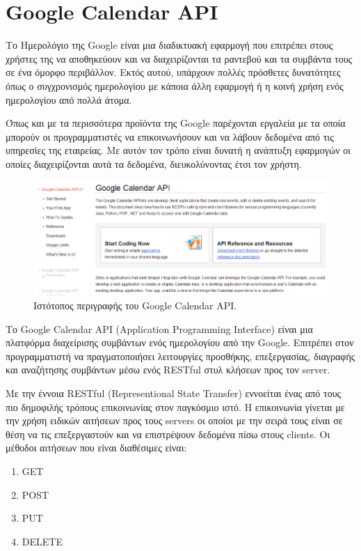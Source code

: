 
\chapter{Google Calendar API}
Το Ημερολόγιο της Google είναι μια διαδικτυακή εφαρμογή που επιτρέπει στους χρήστες της να αποθηκεύουν και να διαχειρίζονται τα ραντεβού και τα συμβάντα τους σε ένα όμορφο περιβάλλον. Εκτός αυτού, υπάρχουν πολλές πρόσθετες δυνατότητες όπως ο συγχρονισμός ημερολογίου με κάποια άλλη εφαρμογή ή η κοινή χρήση ενός ημερολογίου από 
πολλά άτομα.

Όπως και με τα περισσότερα προϊόντα της Google παρέχονται εργαλεία με τα οποία μπορούν οι προγραμματιστές να επικοινωνήσουν και να λάβουν δεδομένα από τις υπηρεσίες της εταιρείας. Με 
αυτόν τον τρόπο είναι δυνατή η ανάπτυξη εφαρμογών οι οποίες διαχειρίζονται αυτά τα δεδομένα, διευκολύνοντας έτσι τον χρήστη.

\begin{figure}[h]
\centering
\includegraphics[width=150mm]{images/google-calendar-api.png}
\caption{Ιστότοπος περιγραφής του Google Calendar API.}
\label{google-calendar-api}
\end{figure}

Το Google Calendar API (Application Programming Interface) 
είναι μια πλατφόρμα διαχείρισης συμβάντων ενός ημερολογίου από την Google. Επιτρέπει στον προγραμματιστή να πραγματοποιήσει λειτουργίες προσθήκης, επεξεργασίας, διαγραφής και αναζήτησης συμβάντων μέσω ενός RESTful στυλ κλήσεων προς τον server.

Με την έννοια RESTful (Representional State Transfer) εννοείται ένας από τους πιο δημοφιλής τρόπους επικοινωνίας στον παγκόσμιο ιστό. Η επικοινωνία γίνεται με την χρήση ειδικών αιτήσεων προς τους servers οι οποίοι με την σειρά τους είναι σε θέση να τις επεξεργαστούν και να επιστρέψουν δεδομένα πίσω στους clients. Οι μέθοδοι αιτήσεων που είναι διαθέσιμες είναι:
\begin{enumerate}
\item GET
\item POST
\item PUT
\item DELETE
\end{enumerate}

